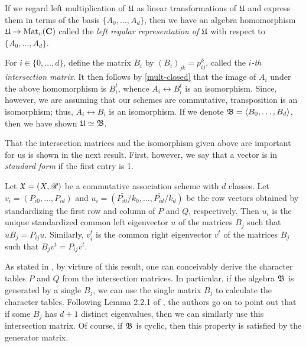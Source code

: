 \documentclass[../../../main]{subfiles}
\begin{document}
 If we regard left multiplication of $\mathfrak{U}$ as linear transformations of $\mathfrak{U}$ and express them in terms of the basis $\{A_0, \dots, A_d\}$, then we have an algebra homomorphism $\mathfrak{U} \rightarrow \text{Mat}_v(\mathbf{C})$ called the {\it left regular representation of $\mathfrak{U}$} with respect to $\{A_0, \dots, A_d\}$. 
 
 For $i \in \{0, \dots, d\}$, define the matrix $B_i$ by $(B_i)_{jk}=p_{ij}^k$, called the {\it $i$-th intersection matrix}. It then follows by \ref{mult-closed} that the image of $A_i$ under the above homomorphism is $B_i^t$, whence $A_i \leftrightarrow B_i^t$ is an isomorphism. Since, however, we are assuming that our schemes are commutative, transposition is an isomorphism; thus, $A_i \leftrightarrow B_i$ is an isomorphism. If we denote $\mathfrak{B}=\langle B_0, \dots, B_d\rangle$, then we have shown $\mathfrak{U}\simeq\mathfrak{B}$.
 
 That the intersection matrices and the isomorphism given above are important for us is shown in the next result. First, however, we say that a vector is in {\it standard form} if the first entry is 1.
 
 \begin{thm}\label{intersect-thm}
 Let $\mathfrak{X}=(X,\mathscr{R})$ be a commutative association scheme with $d$ classes. Let $v_i=(P_{i0},\dots,P_{id})$ and $u_i=(\bar{P_{i0}}/k_0, \dots, \bar{P_{id}}/k_d)$ be the row vectors obtained by standardizing the first row and column of $P$ and $Q$, respectively. Then $u_i$ is the unique standardized common left eigenvector $u$ of the matrices $B_j$ such that $uB_j=P_{ij}u$. Similarly, $v_i^t$ is the common right eigenvector $v^t$ of the matrices $B_j$ such that $B_jv^t=P_{ij}v^t$.
 \end{thm}

 As stated in \cite{bannaialgebraic}, by virture of this result, one can conceivably derive the character tables $P$ and $Q$ from the intersection matrices. In particular, if the algebra $\mathfrak{B}$ is generated by a single $B_j$, we can use the single matrix $B_j$ to calculate the character tables. Following Lemma 2.2.1 of \cite{distance-regular-graphs}, the authors go on to point out that if some $B_j$ has $d+1$ distinct eigenvalues, then we can similarly use this intersection matrix. Of course, if $\mathfrak{B}$ is cyclic, then this property is satisfied by the generator matrix.

\biblio
\end{document}
